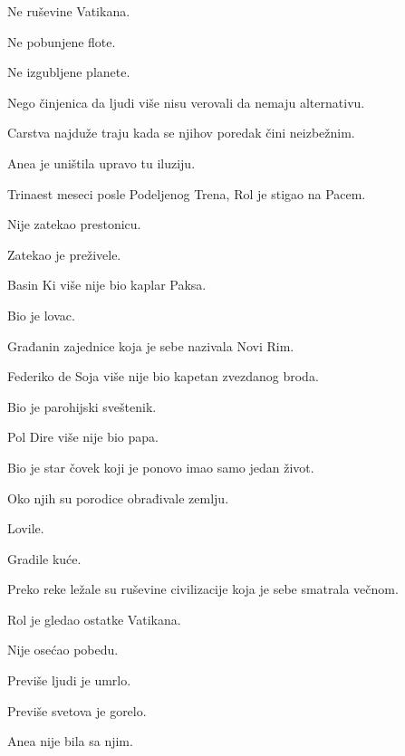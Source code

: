 \bigskip

Ne ruševine Vatikana.

Ne pobunjene flote.

Ne izgubljene planete.

\bigskip

Nego činjenica da ljudi više nisu verovali da nemaju alternativu.

\bigskip

Carstva najduže traju kada se njihov poredak čini neizbežnim.

\bigskip

Anea je uništila upravo tu iluziju.

\bigskip

Trinaest meseci posle Podeljenog Trena, Rol je stigao na Pacem.

\bigskip

Nije zatekao prestonicu.

\bigskip

Zatekao je preživele.

\bigskip

Basin Ki više nije bio kaplar Paksa.

Bio je lovac.

Građanin zajednice koja je sebe nazivala Novi Rim.

\bigskip

Federiko de Soja više nije bio kapetan zvezdanog broda.

Bio je parohijski sveštenik.

\bigskip

Pol Dire više nije bio papa.

Bio je star čovek koji je ponovo imao samo jedan život.

\bigskip

Oko njih su porodice obrađivale zemlju.

Lovile.

Gradile kuće.

\bigskip

Preko reke ležale su ruševine civilizacije koja je sebe smatrala večnom.

\bigskip

Rol je gledao ostatke Vatikana.

\bigskip

Nije osećao pobedu.

\bigskip

Previše ljudi je umrlo.

Previše svetova je gorelo.

Anea nije bila sa njim.

